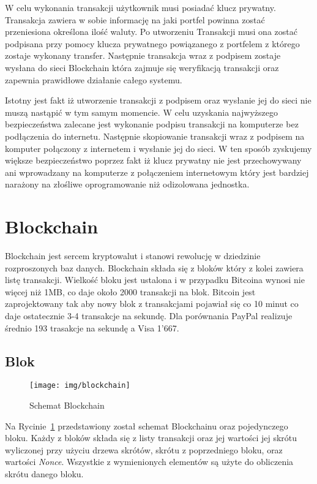 \documentclass[journal,12pt,onecolumn,draftclsnofoot,]{IEEEtran}
\begin{document}
W celu wykonania transakcji użytkownik musi posiadać klucz prywatny. Transakcja zawiera w sobie informację na jaki
portfel powinna zostać przeniesiona określona ilość waluty. Po utworzeniu Transakcji musi ona zostać podpisana przy
pomocy klucza prywatnego powiązanego z portfelem z którego zostaje wykonany transfer. Następnie transakcja wraz z
podpisem zostaje wysłana do sieci Blockchain która zajmuje się weryfikacją transakcji oraz zapewnia prawidłowe działanie
całego systemu.

Istotny jest fakt iż utworzenie transakcji z podpisem oraz wysłanie jej do sieci nie muszą nastąpić w tym samym
momencie. W celu uzyskania najwyższego bezpieczeństwa zalecane jest wykonanie podpisu transakcji na komputerze bez
podłączenia do internetu. Następnie skopiowanie transakcji wraz z podpisem na komputer połączony z internetem i wysłanie
jej do sieci. W ten sposób zyskujemy większe bezpieczeństwo poprzez fakt iż klucz prywatny nie jest przechowywany ani
wprowadzany na komputerze z połączeniem internetowym który jest bardziej narażony na złośliwe oprogramowanie niż
odizolowana jednostka.

\section{Blockchain}

Blockchain jest sercem kryptowalut i stanowi rewolucję w dziedzinie rozproszonych baz danych. Blockchain składa się z
bloków który z kolei zawiera listę transakcji. Wielkość bloku jest ustalona i w przypadku Bitcoina wynosi nie więcej niż
1MB, co daje około 2000 transakcji na blok.\cite{transakcje} Bitcoin jest zaprojektowany tak aby nowy blok z
transakcjami pojawiał się co 10 minut co daje ostatecznie 3-4 transakcje na sekundę. Dla porównania PayPal realizuje
średnio 193 trasakcje na sekundę a Visa 1'667.\cite{porownanieTransakcji}

\subsection{Blok}

\begin{figure}[!t]
  \centering
  \texttt{[image: img/blockchain]}
  \caption{Schemat Blockchain}
  \label{fig:blockchain}
\end{figure}

Na Rycinie~\ref{fig:blockchain} przedstawiony został schemat Blockchainu oraz pojedynczego bloku. Każdy z bloków składa
się z listy transakcji oraz jej wartości jej skrótu wyliczonej przy użyciu drzewa skrótów, skrótu z poprzedniego bloku,
oraz wartości \textit{Nonce}. Wszystkie z wymienionych elementów są użyte do obliczenia skrótu danego bloku.
\end{document}
